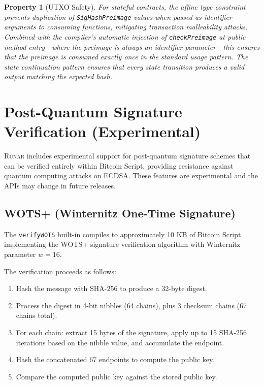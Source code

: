 \documentclass[11pt,a4paper]{article}
\newtheorem{property}[theorem]{Property}
\newcommand{\runar}{\textsc{Rúnar}}
\begin{document}
\begin{property}[UTXO Safety]
\label{prop:utxo-safety}
For stateful contracts, the affine type constraint prevents duplication
of \texttt{SigHashPreimage} values when passed as identifier arguments
to consuming functions, mitigating transaction malleability attacks.
Combined with the compiler's automatic injection of \texttt{checkPreimage}
at public method entry---where the preimage is always an identifier
parameter---this ensures that the preimage is consumed exactly once in
the standard usage pattern. The state continuation pattern ensures that
every state transition produces a valid output matching the expected hash.
\end{property}

\section{Post-Quantum Signature Verification (Experimental)}
\label{sec:pq}

\runar{} includes experimental support for post-quantum signature schemes
that can be verified entirely within Bitcoin Script, providing resistance
against quantum computing attacks on ECDSA. These features are experimental
and the APIs may change in future releases.

\subsection{WOTS+ (Winternitz One-Time Signature)}
\label{sec:wots}

The \texttt{verifyWOTS} built-in compiles to approximately 10 KB of Bitcoin
Script implementing the WOTS+ signature verification algorithm with
Winternitz parameter $w = 16$.

The verification proceeds as follows:
\begin{enumerate}[nosep]
  \item Hash the message with SHA-256 to produce a 32-byte digest.
  \item Process the digest in 4-bit nibbles (64 chains), plus 3 checksum
    chains (67 chains total).
  \item For each chain: extract 15 bytes of the signature, apply up to 15
    SHA-256 iterations based on the nibble value, and accumulate the endpoint.
  \item Hash the concatenated 67 endpoints to compute the public key.
  \item Compare the computed public key against the stored public key.
\end{enumerate}
\end{document}
